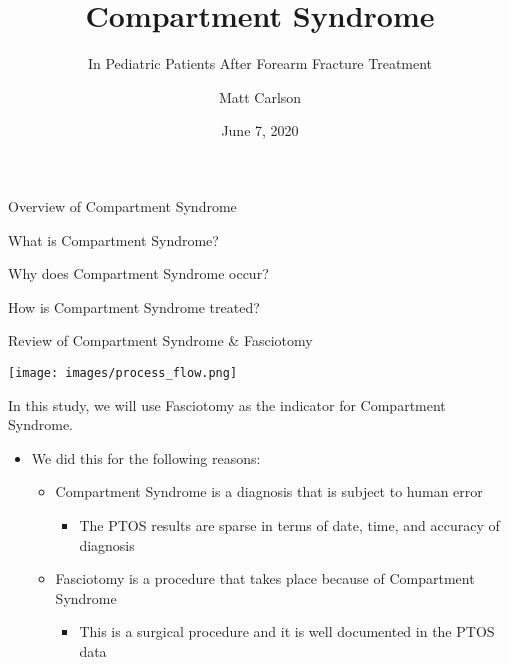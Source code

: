 \documentclass[
  ignorenonframetext,
]{beamer}
\title{Compartment Syndrome}
\subtitle{In Pediatric Patients After Forearm Fracture Treatment}
\author{Matt Carlson}
\date{June 7, 2020}
\providecommand{\tightlist}{%
  \setlength{\itemsep}{0pt}\setlength{\parskip}{0pt}}
\begin{document}
\frame{\titlepage}

\begin{frame}{ Overview of Compartment Syndrome }
\protect\hypertarget{overview-of-compartment-syndrome}{}

\begin{block}{What is Compartment Syndrome?}

\end{block}

\begin{block}{Why does Compartment Syndrome occur?}

\end{block}

\begin{block}{How is Compartment Syndrome treated?}

\end{block}

\begin{block}{Review of Compartment Syndrome \& Fasciotomy}

\texttt{[image: images/process\_flow.png]}

In this study, we will use Fasciotomy as the indicator for Compartment
Syndrome.

\begin{itemize}
\tightlist
\item
  We did this for the following reasons:

  \begin{itemize}
  \tightlist
  \item
    Compartment Syndrome is a diagnosis that is subject to human error

    \begin{itemize}
    \tightlist
    \item
      The PTOS results are sparse in terms of date, time, and accuracy
      of diagnosis
    \end{itemize}
  \item
    Fasciotomy is a procedure that takes place because of Compartment
    Syndrome

    \begin{itemize}
    \tightlist
    \item
      This is a surgical procedure and it is well documented in the PTOS
      data
    \end{itemize}
  \end{itemize}
\end{itemize}

\end{block}

\end{frame}
\end{document}
